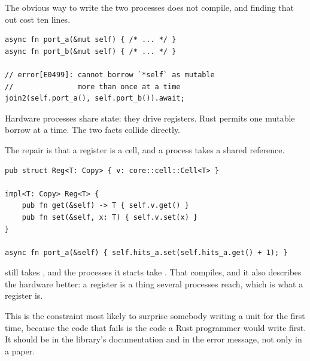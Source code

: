 The obvious way to write the two processes does not compile, and finding
that out cost ten lines.

\begin{lstlisting}[caption={What does not compile, and the error it gives. This is the code a Rust programmer writes first.},label={lst:e0499}]
async fn port_a(&mut self) { /* ... */ }
async fn port_b(&mut self) { /* ... */ }

// error[E0499]: cannot borrow `*self` as mutable
//               more than once at a time
join2(self.port_a(), self.port_b()).await;
\end{lstlisting}

Hardware processes share state: they drive registers. Rust permits one
mutable borrow at a time. The two facts collide directly.

The repair is that a register is a cell, and a process takes a shared
reference.

\begin{lstlisting}[caption={The repair. A register is a cell several processes reach, which is what a register is.},label={lst:reg}]
pub struct Reg<T: Copy> { v: core::cell::Cell<T> }

impl<T: Copy> Reg<T> {
    pub fn get(&self) -> T { self.v.get() }
    pub fn set(&self, x: T) { self.v.set(x) }
}

async fn port_a(&self) { self.hits_a.set(self.hits_a.get() + 1); }
\end{lstlisting}

 still takes , and the processes it starts take
. That compiles, and it also describes the hardware better: a
register is a thing several processes reach, which is what a register is.

\begin{pitfall}
This is the constraint most likely to surprise somebody writing a unit for
the first time, because the code that fails is the code a Rust programmer
would write first. It should be in the library's documentation and in the
error message, not only in a paper.
\end{pitfall}
